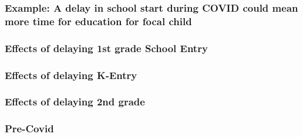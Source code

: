 \documentclass{beamer}
\begin{document}
\begin{frame}
    \label{update_scott}
    \frametitle{Example: A delay in school start during COVID could mean more time for education for focal child}
 {
    }
\end{frame}


\begin{frame}
    \frametitle{Effects of delaying 1st grade School Entry}
    
\end{frame}

\begin{frame}
    \frametitle{Effects of delaying K-Entry}
    
\end{frame}


\begin{frame}
    \frametitle{Effects of delaying 2nd grade}
    
\end{frame}

\begin{frame}
    \label{update_scott}
    \frametitle{Pre-Covid}
 {
    }
\end{frame}
\end{document}

